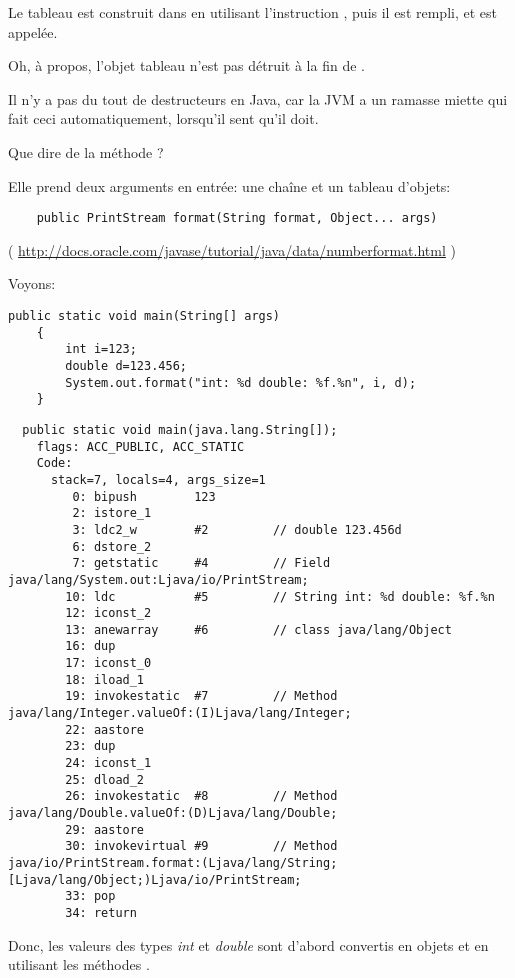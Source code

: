 Le tableau est construit dans \main en utilisant l'instruction , puis
il est rempli, et \ttf est appelée.

Oh, à propos, l'objet tableau n'est pas détruit à la fin de \main.

Il n'y a pas du tout de destructeurs en Java, car la JVM a un ramasse miette qui
fait ceci automatiquement, lorsqu'il sent qu'il doit.

Que dire de la méthode ?

Elle prend deux arguments en entrée: une chaîne et un tableau d'objets:

\begin{lstlisting}
	public PrintStream format(String format, Object... args)
\end{lstlisting}
( \url{http://docs.oracle.com/javase/tutorial/java/data/numberformat.html} )

Voyons:

\begin{lstlisting}[style=customjava]
	public static void main(String[] args)
	{
		int i=123;
		double d=123.456;
		System.out.format("int: %d double: %f.%n", i, d);
	}
\end{lstlisting}

\begin{lstlisting}
  public static void main(java.lang.String[]);
    flags: ACC_PUBLIC, ACC_STATIC
    Code:
      stack=7, locals=4, args_size=1
         0: bipush        123
         2: istore_1      
         3: ldc2_w        #2         // double 123.456d
         6: dstore_2      
         7: getstatic     #4         // Field java/lang/System.out:Ljava/io/PrintStream;
        10: ldc           #5         // String int: %d double: %f.%n
        12: iconst_2      
        13: anewarray     #6         // class java/lang/Object
        16: dup           
        17: iconst_0      
        18: iload_1       
        19: invokestatic  #7         // Method java/lang/Integer.valueOf:(I)Ljava/lang/Integer;
        22: aastore       
        23: dup           
        24: iconst_1      
        25: dload_2       
        26: invokestatic  #8         // Method java/lang/Double.valueOf:(D)Ljava/lang/Double;
        29: aastore       
        30: invokevirtual #9         // Method java/io/PrintStream.format:(Ljava/lang/String;[Ljava/lang/Object;)Ljava/io/PrintStream;
        33: pop           
        34: return        
\end{lstlisting}

Donc, les valeurs des types \emph{int} et \emph{double} sont d'abord convertis en objets
 et  en utilisant les méthodes .

